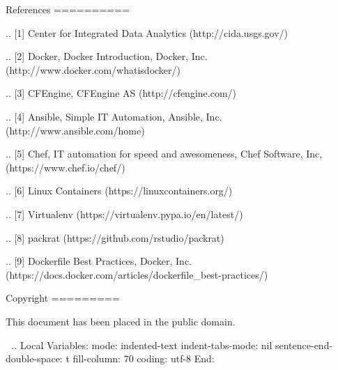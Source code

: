 References
==========

.. [1] Center for Integrated Data Analytics
   (http://cida.usgs.gov/)

.. [2] Docker, Docker Introduction, Docker, Inc.
   (http://www.docker.com/whatisdocker/)

.. [3] CFEngine, CFEngine AS
   (http://cfengine.com/)

.. [4] Ansible, Simple IT Automation, Ansible, Inc.
   (http://www.ansible.com/home)

.. [5] Chef, IT automation for speed and awesomeness, Chef Software, Inc,
   (https://www.chef.io/chef/)

.. [6] Linux Containers
   (https://linuxcontainers.org/)

.. [7] Virtualenv
   (https://virtualenv.pypa.io/en/latest/)

.. [8] packrat
   (https://github.com/rstudio/packrat)

.. [9] Dockerfile Best Practices, Docker, Inc.
   (https://docs.docker.com/articles/dockerfile_best-practices/)

Copyright
=========

This document has been placed in the public domain.



..
   Local Variables:
   mode: indented-text
   indent-tabs-mode: nil
   sentence-end-double-space: t
   fill-column: 70
   coding: utf-8
   End:
